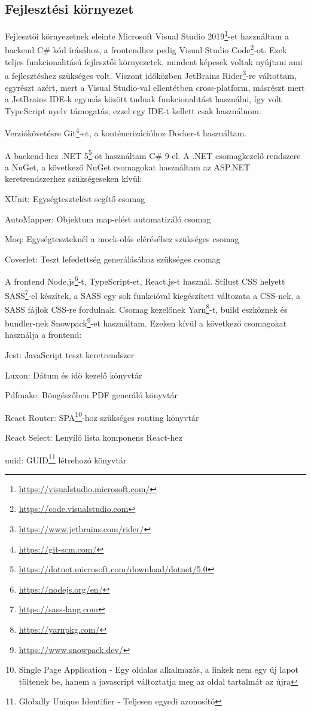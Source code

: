 \subsection{Fejlesztési környezet}

Fejlesztői környezetnek eleinte Microsoft Visual Studio 2019\footnote{\url{https://visualstudio.microsoft.com/}}-et használtam a backend C\# kód írásához, a frontendhez pedig Visual Studio Code\footnote{\url{https://code.visualstudio.com}}-ot. Ezek teljes funkcionalitású fejlesztői környezetek, mindent képesek voltak nyújtani ami a fejlesztéshez szükséges volt. Viszont időközben JetBrains Rider\footnote{\url{https://www.jetbrains.com/rider/}}-re váltottam, egyrészt azért, mert a Visual Studio-val ellentétben cross-platform, másrészt mert a JetBrains IDE-k egymás között tudnak funkcionalitást használni, így volt TypeScript nyelv támogatás, ezzel egy IDE-t kellett csak használnom.

Verziókövetésre Git\footnote{\url{https://git-scm.com/}}-et, a konténerizációhoz Docker-t használtam.

A backend-hez .NET 5\footnote{\url{https://dotnet.microsoft.com/download/dotnet/5.0}}-öt használtam C\# 9-el. A .NET csomagkezelő rendszere a NuGet, a következő NuGet csomagokat használtam az ASP.NET keretrendszerhez szükségeseken kívül:

\begin{compactitem}
	\item XUnit: Egységtesztelést segítő csomag
	\item AutoMapper: Objektum map-elést automatizáló csomag
	\item Moq: Egységteszteknél a mock-olás eléréséhez szükséges csomag
	\item Coverlet: Teszt lefedettség generálásához szükséges csomag
\end{compactitem}

A frontend Node.js\footnote{\url{https://nodejs.org/en/}}-t, TypeScript-et, React.js-t használ. Stílust CSS helyett SASS\footnote{\url{https://sass-lang.com}}-el készítek, a SASS egy sok funkcióval kiegészített változata a CSS-nek, a SASS fájlok CSS-re fordulnak. Csomag kezelőnek Yarn\footnote{\url{https://yarnpkg.com/}}-t, build eszköznek és bundler-nek Snowpack\footnote{\url{https://www.snowpack.dev/}}-et használtam. Ezeken kívül a következő csomagokat használja a frontend:

\begin{compactitem}
	\item Jest: JavaScript teszt keretrendszer
	\item Luxon: Dátum és idő kezelő könyvtár
	\item Pdfmake: Böngészőben PDF generáló könyvtár
	\item React Router: SPA\footnote{Single Page Application - Egy oldalas alkalmazás, a linkek nem egy új lapot töltenek be, hanem a javascript változtatja meg az oldal tartalmát az újra}-hoz szükséges routing könyvtár
	\item React Select: Lenyíló lista komponens React-hez
	\item uuid: GUID\footnote{Globally Unique Identifier - Teljesen egyedi azonosító} létrehozó könyvtár
\end{compactitem}

